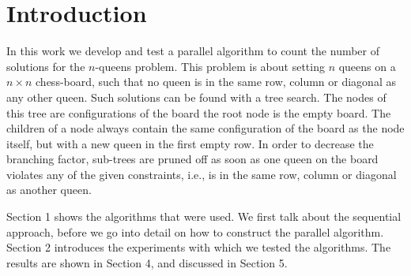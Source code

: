 \section*{Introduction}
In this work we develop and test a parallel algorithm to count the number of solutions for the $n$-queens problem.
This problem is about setting $n$ queens on a $n\times n$ chess-board, such that no queen is in the same row, column or diagonal as any other queen.
Such solutions can be found with a tree search.
The nodes of this tree are configurations of the board the root node is the empty board.
The children of a node always contain the same configuration of the board as the node itself, but with a new queen in the first empty row.
In order to decrease the branching factor, sub-trees are pruned off as soon as one queen on the board violates any of the given constraints, i.e., is in the same row, column or diagonal as another queen.

Section 1 shows the algorithms that were used.
We first talk about the sequential approach, before we go into detail on how to construct the parallel algorithm.
Section 2 introduces the experiments with which we tested the algorithms.
The results are shown in Section 4, and discussed in Section 5.
